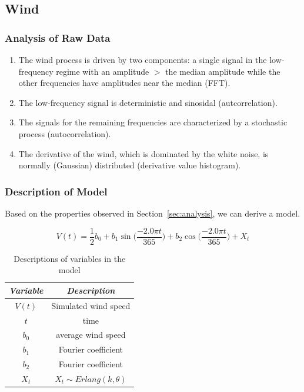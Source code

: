 \documentclass[11pt, letterpaper]{article}
\begin{document}
\subsection{Wind}

\subsubsection{Analysis of Raw Data}

\begin{enumerate}
\item The wind process is driven by two components: a single signal in the low-frequency regime with an amplitude $>$ the median amplitude while the other frequencies have amplitudes near the median (FFT).
\item The low-frequency signal is deterministic and sinosidal (autcorrelation).
\item The signals for the remaining frequencies are characterized by a stochastic process (autocorrelation).
\item The derivative of the wind, which is dominated by the white noise, is normally (Gaussian) distributed (derivative value histogram).
\end{enumerate}


\subsubsection{Description of Model}
Based on the properties observed in Section~\ref{sec:analysis}, we can derive a model.

\begin{equation}
V(t) = \frac{1}{2}b_0 + b_1 \sin\Big(\frac{-2.0 \pi t}{365}\Big) + b_2 \cos\Big(\frac{-2.0 \pi t}{365}\Big) + X_t
\end{equation}

\begin{table}[H]
  \centering
  \begin{tabular}{c c} \hline
  \emph{Variable} & \emph{Description}\\ \hline
  $V(t)$ & Simulated wind speed \\ \hline
  $t$ & time \\ \hline
  $b_0$ & average wind speed \\ \hline
  $b_1$ & Fourier coefficient \\ \hline
  $b_2$ & Fourier coefficient \\ \hline
  $X_t$ & $X_t \sim Erlang(k, \theta)$ \\ \hline 
  \end{tabular}
  \caption{Descriptions of variables in the model}
  \label{tab:analysis-ft-values}
\end{table}
\end{document}

